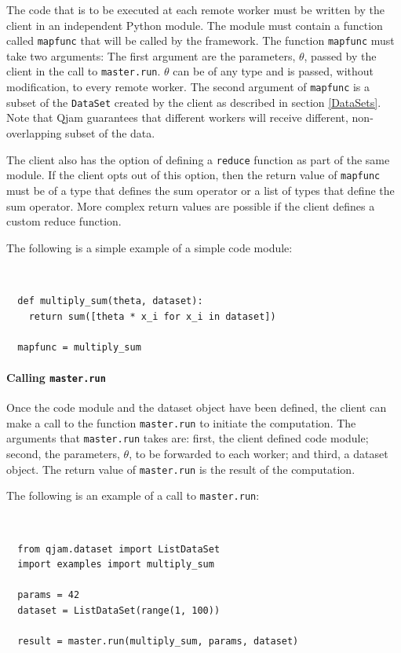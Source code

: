 \documentclass[%
  final,
  notitlepage,
  narroweqnarray,
  inline,
]{ieee}
\begin{document}
The code that is to be executed at each remote worker must be written by the
client in an independent Python module. The module must contain a function
called \texttt{mapfunc} that will be called by the framework. The function
\texttt{mapfunc} must take two arguments: The first argument are the parameters,
$\theta$, passed by the client in the call to \texttt{master.run}. $\theta$ can
be of any type and is passed, without modification, to every remote worker. The
second argument of \texttt{mapfunc} is a subset of the \texttt{DataSet} created
by the client as described in section \ref{DataSets}. Note that Qjam guarantees
that different workers will receive different, non-overlapping subset of the
data.

The client also has the option of defining a \texttt{reduce} function as part
of the same module. If the client opts out of this option, then the return
value of \texttt{mapfunc} must be of a type that defines the sum operator or
a list of types that define the sum operator. More complex return values are
possible if the client defines a custom reduce function.

The following is a simple example of a simple code module:

{\tt \small
\begin{verbatim}
  def multiply_sum(theta, dataset):
    return sum([theta * x_i for x_i in dataset])

  mapfunc = multiply_sum
\end{verbatim}}


\paragraph{Calling \texttt{master.run}}

Once the code module and the dataset object have been defined, the client can
make a call to the function \texttt{master.run} to initiate the computation. The
arguments that \texttt{master.run} takes are: first, the client defined code
module; second, the parameters, $\theta$, to be forwarded to each worker; and
third, a dataset object. The return value of \texttt{master.run} is the result
of the computation.

The following is an example of a call to \texttt{master.run}:

{\tt \small
\begin{verbatim}
  from qjam.dataset import ListDataSet
  import examples import multiply_sum

  params = 42
  dataset = ListDataSet(range(1, 100))
  
  result = master.run(multiply_sum, params, dataset)
\end{verbatim}}
\end{document}
